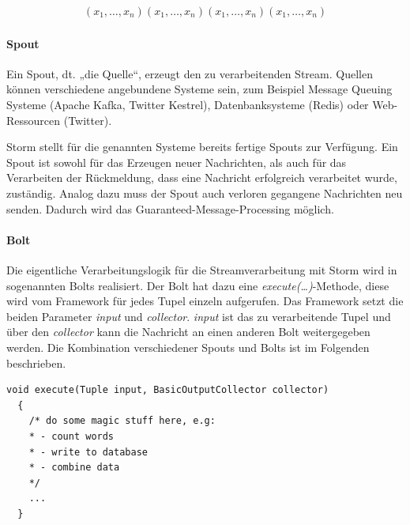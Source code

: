 \documentclass[a4paper,11pt]{scrartcl}
\begin{document}
  \begin{align*}
    (x_1, \ldots , x_n)
    (x_1, \ldots , x_n)
    (x_1, \ldots , x_n)
    (x_1, \ldots , x_n)
  \end{align*}
  \begin{figure}[!h]
    \centering
    \vspace*{-1cm}
  \end{figure}

  \paragraph{Spout}
  Ein Spout, dt. „die Quelle“, erzeugt den zu verarbeitenden Stream.
  Quellen können verschiedene angebundene Systeme sein, zum
  Beispiel Message Queuing Systeme (Apache Kafka, Twitter Kestrel),
  Datenbanksysteme (Redis) oder Web-Ressourcen (Twitter).

  Storm stellt für die genannten Systeme bereits fertige Spouts zur
  Verfügung. Ein Spout ist sowohl für das Erzeugen neuer Nachrichten,
  als auch für das Verarbeiten der Rückmeldung, dass eine Nachricht
  erfolgreich verarbeitet wurde, zuständig. Analog dazu muss der Spout
  auch verloren gegangene Nachrichten neu senden. Dadurch wird das
  Guaranteed-Message-Processing möglich.


  \paragraph{Bolt}
  Die eigentliche Verarbeitungslogik für die Streamverarbeitung mit
  Storm wird in sogenannten Bolts realisiert. Der Bolt hat dazu eine
  \textit{execute(\ldots)}-Methode, diese wird vom Framework für jedes
  Tupel einzeln aufgerufen. Das Framework setzt die beiden Parameter
  \textit{input} und \textit{collector}. \textit{input} ist das zu
  verarbeitende Tupel und über den \textit{collector} kann die
  Nachricht an einen anderen Bolt weitergegeben werden. Die
  Kombination verschiedener Spouts und Bolts ist im Folgenden beschrieben.

  \begin{lstlisting}[caption={Methodensignatur einer Bolt-Implementierung}]
  void execute(Tuple input, BasicOutputCollector collector)
  {
    /* do some magic stuff here, e.g:
    * - count words
    * - write to database
    * - combine data
    */
    ...
  }
  \end{lstlisting}
\end{document}
